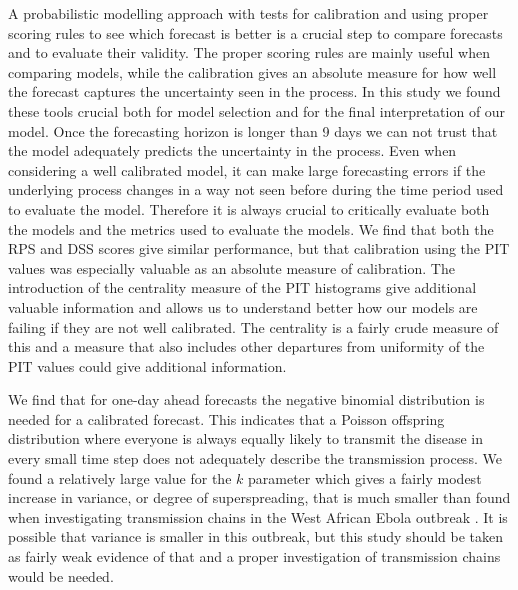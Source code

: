\documentclass[12pt]{article}
\begin{document}
A probabilistic modelling approach with tests for calibration and using proper scoring rules to see which forecast is better is a crucial step to compare forecasts and to evaluate their validity. The proper scoring rules are mainly useful when comparing models, while the calibration gives an absolute measure for how well the forecast captures the uncertainty seen in the process. In this study we found these tools crucial both for model selection and for the final interpretation of our model. Once the forecasting horizon is longer than 9 days we can not trust that the model adequately predicts the uncertainty in the process. Even when considering a well calibrated model, it can make large forecasting errors if the underlying process changes in a way not seen before during the time period used to evaluate the model. Therefore it is always crucial to critically evaluate both the models and the metrics used to evaluate the models. We find that both the RPS and DSS scores give similar performance, but that calibration using the PIT values was especially valuable as an absolute measure of calibration. The introduction of the centrality measure of the PIT histograms give additional valuable information and allows us to understand better how our models are failing if they are not well calibrated. The centrality is a fairly crude measure of this and a measure that also includes other departures from uniformity of the PIT values could give additional information. 

We find that for one-day ahead forecasts the negative binomial distribution is needed for a calibrated forecast. This indicates that a Poisson offspring distribution where everyone is always equally likely to transmit the disease in every small time step does not adequately describe the transmission process. We found a relatively large value for the $k$ parameter which gives a fairly modest increase in variance, or degree of superspreading, that is much smaller than found when investigating transmission chains in the West African Ebola outbreak \cite{internationalebolaresponseteamExposurePatternsDriving2016}. It is possible that variance is smaller in this outbreak, but this study should be taken as fairly weak evidence of that and a proper investigation of transmission chains would be needed. 
\end{document}
